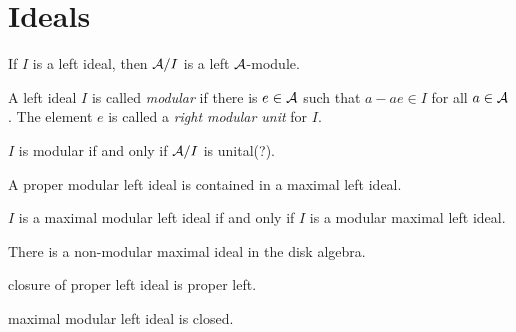 \documentclass{../note}
\begin{document}
\section{Ideals}
\begin{prb}[Ideals]
\begin{parts}
\item If $I$ is a left ideal, then $\mathcal{A}/I$ is a left $\mathcal{A}$-module.
\end{parts}
\end{prb}

\begin{prb}
A left ideal $I$ is called \emph{modular} if there is $e\in\mathcal{A}$ such that $a-ae\in I$ for all $a\in\mathcal{A}$.
The element $e$ is called a \emph{right modular unit} for $I$.
\begin{parts}
\item $I$ is modular if and only if $\mathcal{A}/I$ is unital(?).
\item A proper modular left ideal is contained in a maximal left ideal.
\item $I$ is a maximal modular left ideal if and only if $I$ is a modular maximal left ideal.
\item There is a non-modular maximal ideal in the disk algebra.
\end{parts}
\end{prb}

\begin{prb}
\begin{parts}
\item closure of proper left ideal is proper left.
\item maximal modular left ideal is closed.
\end{parts}
\end{prb}
\end{document}
